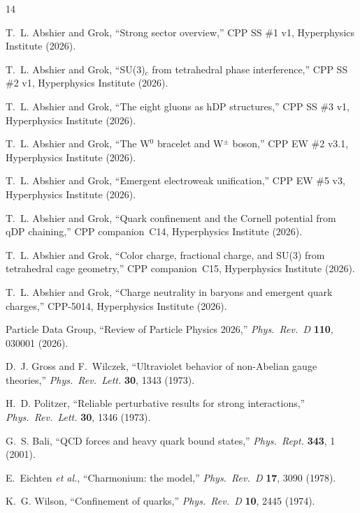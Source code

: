 \documentclass[11pt,a4paper]{article}
\begin{document}

\begin{thebibliography}{14}

T.~L. Abshier and Grok,
``Strong sector overview,''
CPP SS \#1 v1, Hyperphysics Institute (2026).

T.~L. Abshier and Grok,
``SU(3)$_c$ from tetrahedral phase interference,''
CPP SS \#2 v1, Hyperphysics Institute (2026).

T.~L. Abshier and Grok,
``The eight gluons as hDP structures,''
CPP SS \#3 v1, Hyperphysics Institute (2026).

T.~L. Abshier and Grok,
``The W$^0$ bracelet and W$^\pm$ boson,''
CPP EW \#2 v3.1, Hyperphysics Institute (2026).

T.~L. Abshier and Grok,
``Emergent electroweak unification,''
CPP EW \#5 v3, Hyperphysics Institute (2026).

T.~L. Abshier and Grok,
``Quark confinement and the Cornell potential from qDP chaining,''
CPP companion~C14, Hyperphysics Institute (2026).

T.~L. Abshier and Grok,
``Color charge, fractional charge, and SU(3) from tetrahedral cage geometry,''
CPP companion~C15, Hyperphysics Institute (2026).

T.~L. Abshier and Grok,
``Charge neutrality in baryons and emergent quark charges,''
CPP-5014, Hyperphysics Institute (2026).

Particle Data Group,
``Review of Particle Physics 2026,''
\textit{Phys.\ Rev.\ D} \textbf{110}, 030001 (2026).

D.~J. Gross and F.~Wilczek,
``Ultraviolet behavior of non-Abelian gauge theories,''
\textit{Phys.\ Rev.\ Lett.} \textbf{30}, 1343 (1973).

H.~D. Politzer,
``Reliable perturbative results for strong interactions,''
\textit{Phys.\ Rev.\ Lett.} \textbf{30}, 1346 (1973).

G.~S. Bali,
``QCD forces and heavy quark bound states,''
\textit{Phys.\ Rept.} \textbf{343}, 1 (2001).

E.~Eichten \textit{et al.},
``Charmonium: the model,''
\textit{Phys.\ Rev.\ D} \textbf{17}, 3090 (1978).

K.~G. Wilson,
``Confinement of quarks,''
\textit{Phys.\ Rev.\ D} \textbf{10}, 2445 (1974).

\end{thebibliography}
\end{document}
